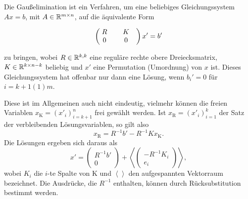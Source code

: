 \section{}

Die Gaußelimination ist ein Verfahren, um eine beliebiges
Gleichungssystem $Ax=b$, mit $A\in\mathbb{R}^{m\times n}$, auf die
äquivalente Form
{\samepage\vspace{\medskipamount}%
\begin{equation}
  \label{eq:rform}
  \begin{pmatrix}
    \tikzlabel{rl}\;R\;\tikzlabel{rr} & \tikzlabel{kl}\quad K\quad\tikzlabel{kr} \\
    0 & 0
  \end{pmatrix} x' = b'
\end{equation}
}

zu bringen, wobei $R\in\mathbb{R}^{k,k}$ eine reguläre rechte obere Dreiecksmatrix,
$K\in\mathbb{R}^{k\times n-k}$ beliebig und $x'$ eine Permutation
(Umordnung) von $x$ ist. Dieses Gleichungssystem hat offenbar nur dann
eine Lösung, wenn $b_i'=0$ für $i=k+1(1)m$.

Diese ist im Allgemeinen auch nicht eindeutig, vielmehr können die
freien Variablen $x_\text{K} = (x'_i)_{i=k+1}^{n}$ frei gewählt
werden. Ist $x_\text{R} = (x'_i)_{i=1}^{k}$ der Satz der
verbleibenden Lösungsvariablen, so gilt also
\begin{equation*}
  x_\text{R} = R^{-1}b' - R^{-1}K x_\text{K}.
\end{equation*}
Die Lösungen ergeben sich daraus als
\begin{equation}
  x' =
  \begin{pmatrix}
    R^{-1}b'\\
    0
  \end{pmatrix} +
  \left<
    \begin{pmatrix}
      -R^{-1}K_i\\
      e_i
    \end{pmatrix}
  \right>,
\end{equation}
wobei $K_i$ die $i$-te Spalte von K und
$\left<\right>$ den aufgespannten Vektorraum bezeichnet. Die
Ausdrücke, die $R^{-1}$ enthalten, können durch Rücksubstitution bestimmt
werden.

